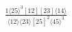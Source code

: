 \documentclass[varwidth, border=5pt]{standalone}
\begin{document}
\begin{my}
$\begin{gathered}
\scriptscriptstyle\frac{1⟨25⟩^3[12][23]⟨14⟩}{⟨12⟩⟨23⟩[25]^2⟨45⟩^3}
\end{gathered}$
\end{my}
\end{document}
